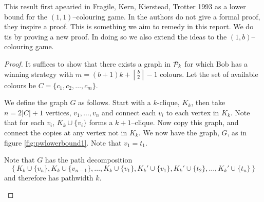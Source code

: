 This result first apearied in Fragile, Kern, Kierstead, Trotter 1993 \cite{faKeKiTr1993} as a lower bound for the $(1,1)$--colouring game. In \cite{faKeKiTr1993} the authors do not give a formal proof, they inspire a proof. This is something we aim to remedy in this report. We do tis by proving a new proof. In doing so we also extend the ideas to the $(1,b)$--colouring game.
\begin{proof}
    It suffices to show that there exists a graph in $\mathcal{P}_k$ for which Bob has a winning strategy with $m=(b+1)k+\left\lceil\frac{b}{2}\right\rceil-1$ colours. Let the set of available colours be $C=\{c_1,c_2,\dots,c_m\}$.
    
    We define the graph $G$ as follows. Start with a $k$-clique, $K_k$, then take $n=2|C|+1$ vertices, $v_1,\dots,v_n$ and connect each $v_i$ to each vertex in $K_k$. Note that for each $v_i$, $K_k\cup\{v_i\}$ forms a $k+1$--clique. Now copy this graph, and connect the copies at any vertex not in $K_k$. We now have the graph, $G$, as in figure \ref{fig:pwlowerbound1}. Note that $v_1=t_1$. 
    
    Note that $G$ has the path decomposition \[\left\{K_k\cup\{v_n\}, K_k\cup\{v_{n-1}\}, \dots, K_k\cup\{v_1\}, K_k'\cup\{v_1\}, K_k'\cup\{t_2\}, \dots, K_k'\cup\{t_n\}\right\}\] and therefore has pathwidth $k$.
\begin{figure}[H]
    \centering
{}
\end{figure}
\end{proof}
